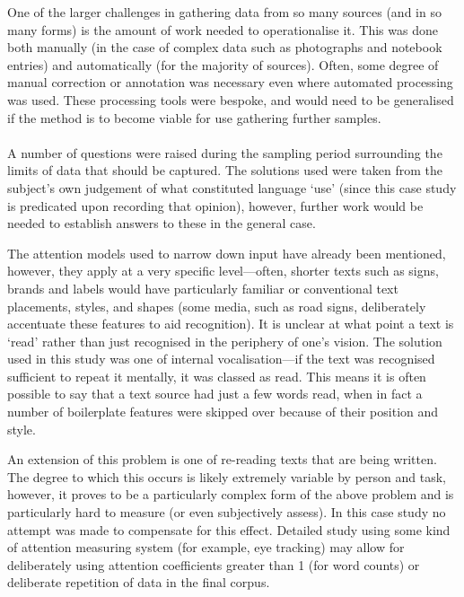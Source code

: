 One of the larger challenges in gathering data from so many sources (and in so many forms) is the amount of work needed to operationalise it.  This was done both manually (in the case of complex data such as photographs and notebook entries) and automatically (for the majority of sources).  Often, some degree of manual correction or annotation was necessary even where automated processing was used.  These processing tools were bespoke, and would need to be generalised if the method is to become viable for use gathering further samples.



\paragraph{}
A number of questions were raised during the sampling period surrounding the limits of data that should be captured.  The solutions used were taken from the subject's own judgement of what constituted language `use' (since this case study is predicated upon recording that opinion), however, further work would be needed to establish answers to these in the general case.


The attention models used to narrow down input have already been mentioned, however, they apply at a very specific level---often, shorter texts such as signs, brands and labels would have particularly familiar or conventional text placements, styles, and shapes (some media, such as road signs, deliberately accentuate these features to aid recognition).  It is unclear at what point a text is `read' rather than just recognised in the periphery of one's vision.  The solution used in this study was one of internal vocalisation---if the text was recognised sufficient to repeat it mentally, it was classed as read.  This means it is often possible to say that a text source had just a few words read, when in fact a number of boilerplate features were skipped over because of their position and style.


An extension of this problem is one of re-reading texts that are being written.  The degree to which this occurs is likely extremely variable by person and task, however, it proves to be a particularly complex form of the above problem and is particularly hard to measure (or even subjectively assess).  In this case study no attempt was made to compensate for this effect.  Detailed study using some kind of attention measuring system (for example, eye tracking) may allow for deliberately using attention coefficients greater than 1 (for word counts) or deliberate repetition of data in the final corpus.


